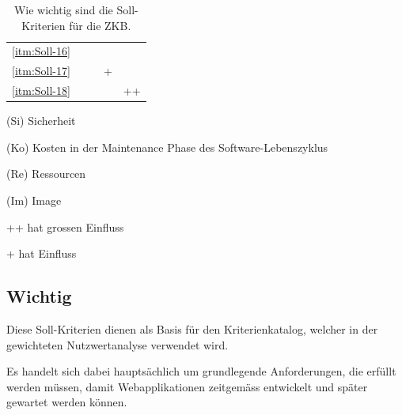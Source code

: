 \begin{table}[htb]
\begin{center}
\begin{threeparttable}
\begin{tabular}{p{9cm}cccc}
          \ref{itm:Soll-16} &    &    &    &    \\
          \ref{itm:Soll-17} &    &    & +  &    \\
          \ref{itm:Soll-18} &    &    &    & ++ \\
          \bottomrule
        \end{tabular}
        \caption{Wie wichtig sind die Soll-Kriterien für die ZKB.}
        \label{tab:kosolidierungDerSollKriterien}
        \medskip 
        \begin{tablenotes}[++]\footnotesize 
          \item[(Si)] Sicherheit 
          \item[(Ko)] Kosten in der Maintenance Phase des Software-Lebenszyklus
          \item[(Re)] Ressourcen 
          \item[(Im)] Image
          \item[++] hat grossen Einfluss
          \item[+] hat Einfluss
        \end{tablenotes}
      \end{threeparttable}
    \end{center}
  \end{table}
  
  \subsection{Wichtig}
  
  Diese Soll-Kriterien dienen als Basis für den Kriterienkatalog, welcher in der
  gewichteten Nutzwertanalyse verwendet wird.
  
  Es handelt sich dabei hauptsächlich um grundlegende Anforderungen, die
  erfüllt werden müssen, damit Webapplikationen zeitgemäss entwickelt und
  später gewartet werden können.
  
